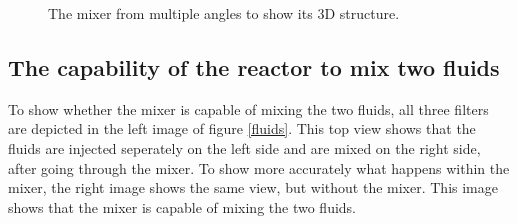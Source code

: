 \documentclass{article}
\begin{document}
\begin{figure}[ht]
\centering
{}
\caption{The mixer from multiple angles to show its 3D structure.}
\label{mixerMorph}
\end{figure}  

\newpage
\subsection*{The capability of the reactor to mix two fluids}
To show whether the mixer is capable of mixing the two fluids, all three filters are depicted in the left image of figure \ref{fluids}. This top view shows that the fluids are injected seperately on the left side and are mixed on the right side, after going through the mixer. To show more accurately what happens within the mixer, the right image shows the same view, but without the mixer. This image shows that the mixer is capable of mixing the two fluids.
\end{document}
